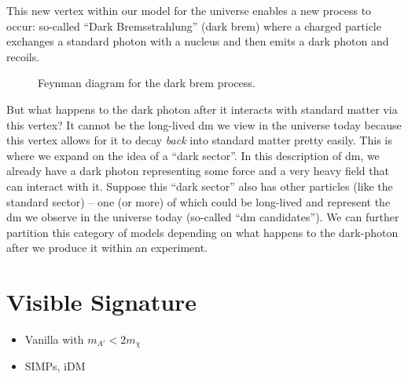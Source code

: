This new vertex within our model for the universe enables a new process to occur: so-called
``Dark Bremsstrahlung'' (dark brem) where a charged particle exchanges a standard photon with
a nucleus and then emits a dark photon and recoils.

\begin{figure}
    \centering
    \caption{
        Feynman diagram for the dark brem process.
    }
    \label{fig:dark-brem-feynman}
\end{figure}

But what happens to the dark photon after it interacts with standard matter via this vertex?
It cannot be the long-lived \gls{dm} we view in the universe today because this vertex allows for
it to decay \emph{back} into standard matter pretty easily. This is where we expand on the idea of
a ``dark sector''. In this description of \gls{dm}, we already have a dark photon representing some
force and a very heavy field that can interact with it. Suppose this ``dark sector'' also has other
particles (like the standard sector) -- one (or more) of which could be long-lived and represent
the \gls{dm} we observe in the universe today (so-called ``\gls{dm} candidates''). We can further
partition this category of models depending on what happens to the \gls{dark-photon} after we produce
it within an experiment.

\section{Visible Signature}
\begin{itemize}
    \item Vanilla with $m_{A'} < 2m_\chi$
    \item SIMPs, iDM
\end{itemize}

